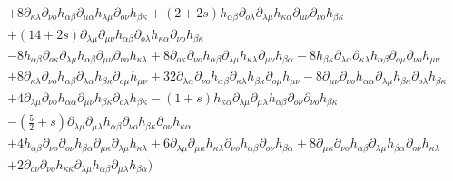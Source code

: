 \documentclass[a4paper,12pt]{article}
\begin{document}
\begin{equation}
{\begin{array}{l}
   + 8\partial _{\kappa\lambda} \partial _{\nu o} h_{\alpha\beta} \partial _{\mu\alpha} h_{\lambda\mu} \partial _{ o\nu} h_{\beta\kappa}  + (2 + 2s)h_{\alpha\beta} \partial _{ o\lambda} \partial _{\lambda\mu} h_{\kappa\alpha} \partial _{\mu\nu} \partial _{\nu o} h_{\beta\kappa} \\ + (14 + 2s)\partial _{\lambda\mu} \partial _{\mu\nu} h_{\alpha\beta} \partial _{ o\lambda} h_{\kappa\alpha} \partial _{\nu o} h_{\beta\kappa}  \\
   - 8h_{\alpha\beta} \partial _{ o\kappa} \partial _{\lambda\mu} h_{\alpha\beta} \partial _{\mu\nu} \partial _{\nu o} h_{\kappa\lambda}  + 8\partial _{ o\kappa} \partial _{\nu o} h_{\alpha\beta} \partial _{\lambda\mu} h_{\kappa\lambda} \partial _{\mu\nu} h_{\beta\alpha}  - 8h_{\beta\kappa} \partial _{\lambda\alpha} \partial _{\kappa\lambda} h_{\alpha\beta} \partial _{ o\mu} \partial _{\nu o} h_{\mu\nu}   \\
   + 8\partial _{\kappa\lambda} \partial _{\nu o} h_{\alpha\beta} \partial _{\lambda\alpha} h_{\beta\kappa} \partial _{ o\mu} h_{\mu\nu}  + 32\partial _{\lambda\alpha} \partial _{\nu o} h_{\alpha\beta} \partial _{\kappa\lambda} h_{\beta\kappa} \partial _{ o\mu} h_{\mu\nu}  - 8\partial _{\mu\nu} \partial _{\nu o} h_{\alpha\alpha} \partial _{\lambda\mu} h_{\beta\kappa} \partial _{ o\lambda} h_{\beta\kappa}  \\
   + 4\partial _{\lambda\mu} \partial _{\nu o} h_{\alpha\alpha} \partial _{\mu\nu} h_{\beta\kappa} \partial _{ o\lambda} h_{\beta\kappa}  - (1 + s)h_{\kappa\alpha} \partial _{\lambda\mu} \partial _{\mu\lambda} h_{\alpha\beta} \partial _{ o\nu} \partial _{\nu o} h_{\beta\kappa} \\ - (\frac{5}
{2} + s)\partial _{\lambda\mu} \partial _{\mu\lambda} h_{\alpha\beta} \partial _{\nu o} h_{\beta\kappa} \partial _{ o\nu} h_{\kappa\alpha}   \\
   + 4h_{\alpha\beta} \partial _{\nu o} \partial _{ o\nu} h_{\beta\alpha} \partial _{\mu\kappa} \partial _{\lambda\mu} h_{\kappa\lambda}  + 6\partial _{\lambda\mu} \partial _{\mu\kappa} h_{\kappa\lambda} \partial _{\nu o} h_{\alpha\beta} \partial _{ o\nu} h_{\beta\alpha}  + 8\partial _{\mu\kappa} \partial _{\nu o} h_{\alpha\beta} \partial _{\lambda\mu} h_{\beta\alpha} \partial _{ o\nu} h_{\kappa\lambda}  \\
   + 2\partial _{ o\nu} \partial _{\nu o} h_{\kappa\kappa} \partial _{\lambda\mu} h_{\alpha\beta} \partial _{\mu\lambda} h_{\beta\alpha})  \\
\end{array}
}
\end{equation}
\end{document}

